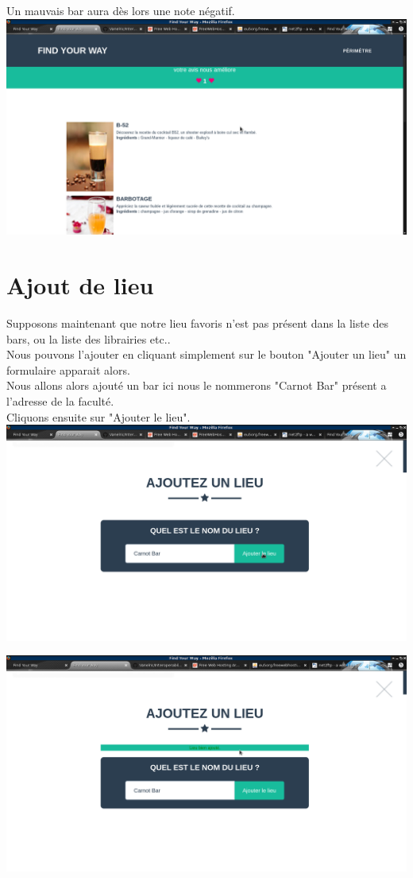 \documentclass[10pt,a4paper, landscape]{report}
\begin{document}
Un mauvais bar aura dès lors une note négatif. \\
\includegraphics[scale=0.5]{images/vote.png} 

\newpage
\section{Ajout de lieu}

Supposons maintenant que notre lieu favoris n'est pas présent dans la liste des bars, ou la liste des librairies etc.. \\
Nous pouvons l'ajouter en cliquant simplement sur le bouton "Ajouter un lieu" un formulaire apparait alors. \\

Nous allons alors ajouté un bar ici nous le nommerons "Carnot Bar" présent a l'adresse de la faculté. \\
Cliquons ensuite sur "Ajouter le lieu".
\includegraphics[scale=0.5]{images/ajout_lieu.png} 

\newpage
\includegraphics[scale=0.5]{images/good_ajout.png} 
\end{document}
